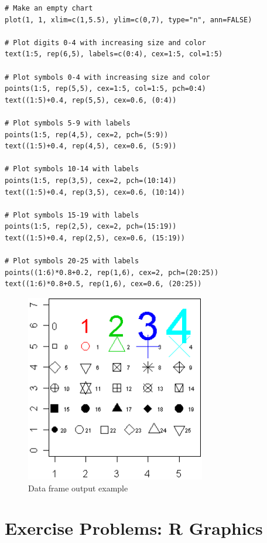 \documentclass[10pt]{book}
\begin{document}
\begin{lstlisting}
# Make an empty chart
plot(1, 1, xlim=c(1,5.5), ylim=c(0,7), type="n", ann=FALSE)

# Plot digits 0-4 with increasing size and color
text(1:5, rep(6,5), labels=c(0:4), cex=1:5, col=1:5)

# Plot symbols 0-4 with increasing size and color
points(1:5, rep(5,5), cex=1:5, col=1:5, pch=0:4)
text((1:5)+0.4, rep(5,5), cex=0.6, (0:4))

# Plot symbols 5-9 with labels
points(1:5, rep(4,5), cex=2, pch=(5:9))
text((1:5)+0.4, rep(4,5), cex=0.6, (5:9))

# Plot symbols 10-14 with labels
points(1:5, rep(3,5), cex=2, pch=(10:14))
text((1:5)+0.4, rep(3,5), cex=0.6, (10:14))

# Plot symbols 15-19 with labels
points(1:5, rep(2,5), cex=2, pch=(15:19))
text((1:5)+0.4, rep(2,5), cex=0.6, (15:19))

# Plot symbols 20-25 with labels
points((1:6)*0.8+0.2, rep(1,6), cex=2, pch=(20:25))
text((1:6)*0.8+0.5, rep(1,6), cex=0.6, (20:25))
\end{lstlisting}
\begin{figure}[H]
    \begin{flushleft}
        \includegraphics[width=0.7\textwidth]{symbols.png}
        \caption{Data frame output example}
        \label{fig:dataframe}
    \end{flushleft}
\end{figure}

\section*{Exercise Problems: R Graphics}
\end{document}
